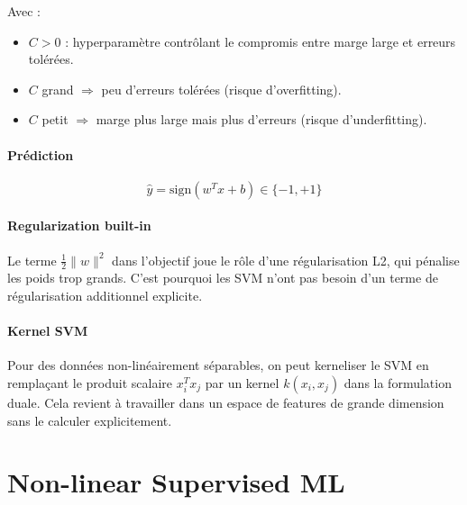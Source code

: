 \documentclass[11pt,a4paper,openany]{book}
\begin{document}
Avec :
\begin{itemize}
    \item $C > 0$ : hyperparamètre contrôlant le compromis entre marge large et erreurs tolérées.
    \item $C$ grand $\Rightarrow$ peu d'erreurs tolérées (risque d'overfitting).
    \item $C$ petit $\Rightarrow$ marge plus large mais plus d'erreurs (risque d'underfitting).
\end{itemize}

\vspace{0.6cm}

\subsubsection{Prédiction}

\[
\hat{y} = \text{sign}(w^T x + b) \in \{-1, +1\}
\]

\vspace{0.6cm}

\subsubsection{Regularization built-in}

Le terme $\frac{1}{2}\|w\|^2$ dans l'objectif joue le rôle d'une régularisation L2, qui pénalise les poids trop grands. C'est pourquoi les SVM n'ont pas besoin d'un terme de régularisation additionnel explicite.

\vspace{0.6cm}

\subsubsection{Kernel SVM}

Pour des données non-linéairement séparables, on peut kerneliser le SVM en remplaçant le produit scalaire $x_i^T x_j$ par un kernel $k(x_i, x_j)$ dans la formulation duale. Cela revient à travailler dans un espace de features de grande dimension sans le calculer explicitement.

\chapter{Non-linear Supervised ML}
\vspace{8cm}
\end{document}
